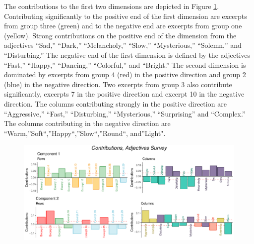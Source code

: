 \documentclass[
  english,
  man,floatsintext]{apa6}
\begin{document}
The contributions to the first two dimensions are depicted in Figure \ref{fig:contributionsA}. Contributing significantly to the positive end of the first dimension are excerpts from group three (green) and to the negative end are excerpts from group one (yellow). Strong contributions on the positive end of the dimension from the adjectives ``Sad,'' ``Dark,'' ``Melancholy,'' ``Slow,'' ``Mysterious,'' ``Solemn,'' and ``Disturbing.'' The negative end of the first dimension is defined by the adjectives ``Fast,'' ``Happy,'' ``Dancing,'' ``Colorful,'' and ``Bright.''
The second dimension is dominated by excerpts from group 4 (red) in the positive direction and group 2 (blue) in the negative direction. Two excerpts from group 3 also contribute significantly, excerpts 7 in the positive direction and excerpt 10 in the negative direction. The columns contributing strongly in the positive direction are ``Aggressive,'' ``Fast,'' ``Disturbing,'' ``Mysterious,'' ``Surprising'' and ``Complex.'' The columns contributing in the negative direction are ``Warm,''Soft``,''Happy``,''Slow``,''Round``, and''Light".

\begin{figure}

{\centering \includegraphics{Music-Descriptor-Space_files/figure-latex/contributionsA-1} 

}

\caption{ }\label{fig:contributionsA}
\end{figure}
\end{document}
